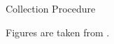 \documentclass[ucs,9pt]{beamer}
\begin{document}
\begin{frame}{Collection Procedure}
\begin{minipage}[c]{0.49\linewidth}
	
\end{minipage}
\centering
\tiny
Figures are taken from \cite{b1}.
\end{frame}
\end{document}
